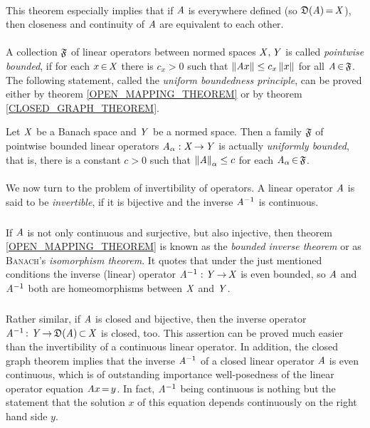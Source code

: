 \documentclass[11pt,twoside]{article}
\begin{document}
\paragraph*{}
This theorem especially implies
that if $\mathit{A}$ is everywhere defined (so $\mathfrak{D}(\mathit{A}) {\,=\,} \mathit{X}$),
then closeness and continuity of $\mathit{A}$ are equivalent to each other.

\paragraph*{} %
A collection $\mathfrak{F}$ of linear operators between normed spaces $\mathit{X}, \mathit{Y}$
is called \textit{pointwise bounded},
if for each $x {\,\in\,} \mathit{X}$ there is $c_x > 0$
such that
$\left\lVert \mathit{A} x \right\rVert \leq c_x \left\lVert x \right\rVert$ for all $\mathit{A} {\,\in\,} \mathfrak{F}$.
The following statement,
called the \textit{uniform boundedness principle},
can be proved either by theorem \ref{OPEN_MAPPING_THEOREM}
or by theorem \ref{CLOSED_GRAPH_THEOREM}.

\begin{theorem}\label{UNIFORM_BOUNDEDNESS_PRINCIPLE}
Let $\mathit{X}$ be a Banach space and $\mathit{Y}$ be a normed space.
Then a family $\mathfrak{F}$ of pointwise bounded linear operators
$\mathit{A}_{\alpha}:\mathit{X} {\,\to\,} \mathit{Y}$ is actually \textit{uniformly bounded},
that is,
there is a constant $c > 0$
such that $\left\lVert \mathit{A} \right\rVert_{\alpha}\leq c$ for each $\mathit{A}_{\alpha}{\,\in\,} \mathfrak{F}$.
\end{theorem}

\paragraph*{}
We now turn to the problem of invertibility of operators.
A linear operator $\mathit{A}$ is said to be \textit{invertible},
if it is bijective and the inverse $\mathit{A}^{-1}$ is continuous.

\subparagraph*{}
If $\mathit{A}$ is not only continuous and surjective,
but also injective,
then theorem \ref{OPEN_MAPPING_THEOREM}
is known as the \textit{bounded inverse theorem}
or as \textsc{Banach}'s \textit{isomorphism theorem}.
It quotes that under the just mentioned conditions
the inverse (linear) operator
$\mathit{A}^{-1}:\mathit{Y} {\,\to\,} \mathit{X}$ is even bounded,
so $\mathit{A}$ and $\mathit{A}^{-1}$ both are homeomorphisms
between $\mathit{X}$ and $\mathit{Y}$.

\subparagraph*{} %
Rather similar,
if $\mathit{A}$ is closed and bijective,
then the inverse operator
$\mathit{A}^{-1} {\,:\,}\,\mathit{Y} {\,\to\,} \mathfrak{D}(\mathit{A}) {\,\subset\,} \mathit{X}$
is closed, too.
This assertion can be proved much easier
than the invertibility of a continuous linear operator.
In addition,
the closed graph theorem implies
that the inverse $\mathit{A}^{-1}$ of a closed linear operator $\mathit{A}$
is even continuous,
which is of outstanding importance {\wrt} well-posedness
of the linear operator equation $\mathit{A} x {\,=\,} y$.
In fact,
$\mathit{A}^{-1}$ being continuous is nothing but the statement
that the solution $x$ of this equation depends continuously
on the right hand side $y$. 
\end{document}
